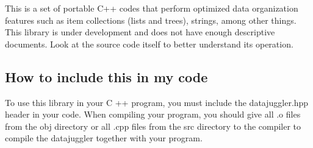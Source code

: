 This is a set of portable C++ codes that perform optimized data organization features such as item collections (lists and trees), strings, among other things. This library is under development and does not have enough descriptive documents. Look at the source code itself to better understand its operation.

\subsection*{How to include this in my code}

To use this library in your C ++ program, you must include the datajuggler.\+hpp header in your code. When compiling your program, you should give all .o files from the obj directory or all .cpp files from the src directory to the compiler to compile the datajuggler together with your program. 